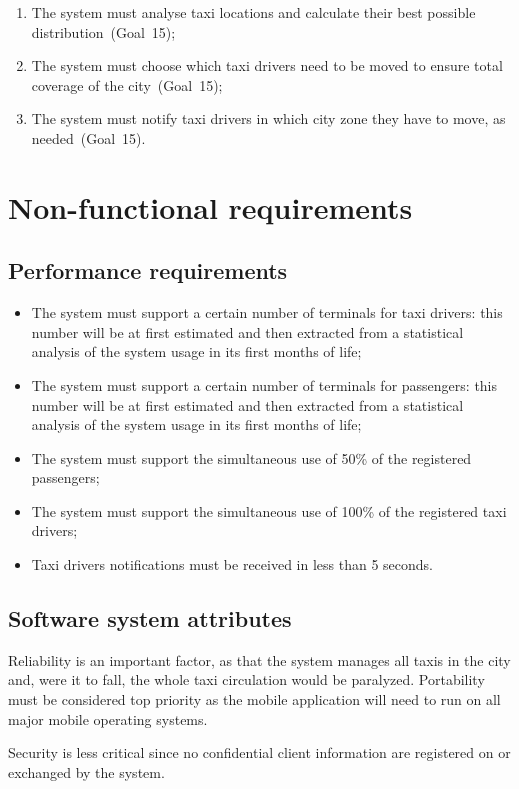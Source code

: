 \begin{enumerate}
\item The system must analyse taxi locations and calculate their best possible distribution~(Goal~15);
\item The system must choose which taxi drivers need to be moved to ensure total coverage of the city~(Goal~15);
\item The system must notify taxi drivers in which city zone they have to move, as needed~(Goal~15).
\end{enumerate}


\section{Non-functional requirements}

\subsection{Performance requirements}
\begin{itemize}

\item The system must support a certain number of terminals for taxi drivers: this number will be at first estimated and then extracted from a statistical analysis of the system usage in its first months of life;
\item The system must support a certain number of terminals for passengers: this number will be at first estimated and then extracted from a statistical analysis of the system usage in its first months of life;
\item The system must support the simultaneous use of 50\% of the registered passengers;
\item The system must support the simultaneous use of 100\% of the registered taxi drivers;
\item Taxi drivers notifications must be received in less than 5 seconds.

\end{itemize}

\subsection{Software system attributes}
Reliability is an important factor, as that the system manages all taxis in the city and, were it to fall, the whole taxi circulation would be paralyzed. Portability must be considered top priority as the mobile application will need to run on all major mobile operating systems.

Security is less critical since no confidential client information are registered on or exchanged by the system.

